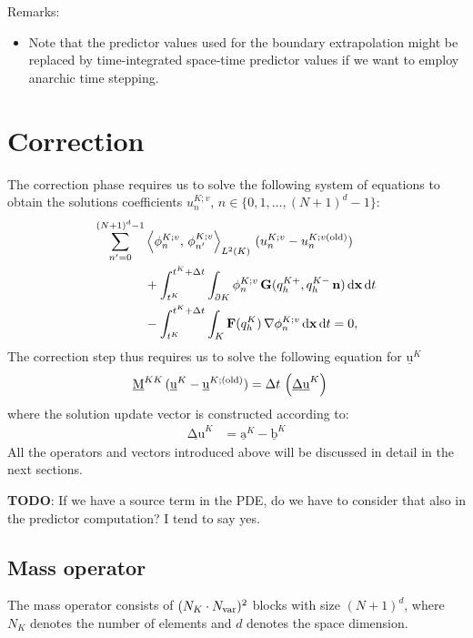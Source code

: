 \documentclass{scrreprt}
\newcommand{\partialup}{\partial}
\theoremstyle{definition}
\theoremstyle{nonumberplain}
\renewcommand{\vec}[1]{{\textbf{#1}}}
\newcommand{\laVec}[1]{\underline{\mathrm{#1}}}
\newcommand{\laMat}[1]{\underline{\mathrm{#1}}}
\newcommand{\cell}{K}
\newcommand{\Ncell}{{N_{\cell}}}
\newcommand{\cellBnd}{{\partialup\cell}}
\newcommand{\dt}{\textup{d}t}
\newcommand{\dV}{\text{d}\vec{x}}
\begin{document}
Remarks:
\begin{itemize}
  \item Note that the predictor values used for the boundary extrapolation might
  be replaced by time-integrated space-time predictor values if
  we want to employ anarchic time stepping.
\end{itemize}

\section{Correction}
The correction phase requires us to solve the following system
of equations
to obtain the solutions
coefficients
$u^{\cell;v}_{n}$,
$n\in\{0,1,\ldots,(N+1)^{d}-1\}$:
\begin{align}
\sum_{n'=0}^{(N+1)^d-1}
&\left\langle 
\phi^{\cell;v}_{n},\,\phi^{\cell;v}_{n'}
\right\rangle
_{L^2(\cell)}
\,
(u^{\cell;v}_{n}-u^{\cell;v(\textup{old})}_{n})
\notag
\\
&+
\int_{t^\cell}^{t^\cell+\Delta t}
\int_\cellBnd
\phi^{\cell;v}_{n}\,\vec{G}(q^{\cell+}_h,q^{\cell-}_h\,\vec{n})\,
\dV\,\dt
\notag
\\
&-
\int_{t^\cell}^{t^\cell+\Delta t}
\int_\cell
\vec{F}(q^{\cell}_h)\,
\nabla \phi^{\cell;v}_{n}\,
\dV\,\dt  = 0,
\end{align}
The correction step thus requires us to solve the following
equation for $\laVec{u}^{\cell}$
\begin{align*}
\laMat{M}^{\cell\cell}\,
(\laVec{u}^{\cell} - \laVec{u}^{\cell;(\textup{old})})
&= \Delta t\,\left (
\laVec{\Delta u}^{\cell}
\right)
\end{align*}
where the solution update vector is constructed according to:
\begin{align*}
\laVec{\Delta u}^{\cell}
&=
\laVec{a}^{\cell}
-
\laVec{b}^{\cell}
\end{align*}
All the operators and vectors introduced above will be discussed
in detail in the next sections. 
\begin{framed}
{\large \textbf{TODO}}: If we have a source term in the PDE, do we have to
consider that also in the predictor computation? I tend to say yes.
\end{framed}
\subsection{Mass operator}
The mass operator consists  of ${(\Ncell\cdot N_\textup{var})^2}$ blocks with
size $(N+1)^d$, where $N_\cell$ denotes the number of elements and
$d$ denotes the space dimension.
\end{document}
